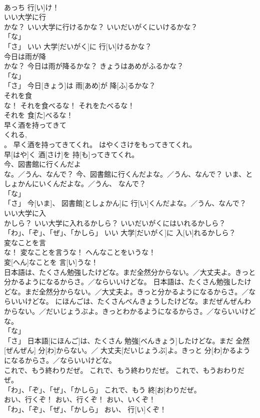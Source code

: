 \documentclass[8pt]{extreport}
\begin{document}
\begin{CJK}{UTF8}{min}
\\	あっち 行[い]け！		
\\	いい大学に行
\\	かな？	いい大学に行けるかな？	いいだいがくにいけるかな？	
\\	「な」 
\\	「さ」	いい 大学[だいがく]に 行[い]けるかな？		
\\	今日は雨が降
\\	かな？	今日は雨が降るかな？	きょうはあめがふるかな？	
\\	「な」 
\\	「さ」	今日[きょう]は 雨[あめ]が 降[ふ]るかな？		
\\	それを食
\\	な！	それを食べるな！	それをたべるな！	
\\	それを 食[た]べるな！		
\\	早く酒を持ってきて
\\	くれる, 
\\	。	早く酒を持ってきてくれ。	はやくさけをもってきてくれ。	
\\	早[はや]く 酒[さけ]を 持[も]ってきてくれ。		
\\	今、図書館に行くんだよ
\\	な。／うん、なんで？	今、図書館に行くんだよな。／うん、なんで？	いま、としょかんにいくんだよな。／うん、 なんで？	
\\	「な」 
\\	「さ」	今[いま]、 図書館[としょかん]に 行[い]くんだよな。／うん、なんで？		
\\	いい大学に入
\\	かしら？	いい大学に入れるかしら？	いいだいがくにはいれるかしら？	
\\	「わ」、「ぞ」、「ぜ」、「かしら」	いい 大学[だいがく]に 入[い]れるかしら？		
\\	変なことを言
\\	な！	変なことを言うな！	へんなことをいうな！	
\\	変[へん]なことを 言[い]うな！		
\\	日本語は、たくさん勉強したけどな。まだ全然分からない。／大丈夫よ。きっと分かるようになるからさ。／ならいいけどな。	日本語は、たくさん勉強したけどな。まだ全然分からない。／大丈夫よ。きっと分かるようになるからさ。／ならいいけどな。	にほんごは、たくさんべんきょうしたけどな。まだぜんぜんわからない。／だいじょうぶよ。きっとわかるようになるからさ。／ならいいけどな。	
\\	「な」 
\\	「さ」	日本語[にほんご]は、たくさん 勉強[べんきょう]したけどな。まだ 全然[ぜんぜん] 分[わ]からない。／ 大丈夫[だいじょうぶ]よ。きっと 分[わ]かるようになるからさ。／ならいいけどな。		
\\	これで、もう終わりだぜ。	これで、もう終わりだぜ。	これで、もうおわりだぜ。	
\\	「わ」、「ぞ」、「ぜ」、「かしら」	これで、もう 終[お]わりだぜ。		
\\	おい、行くぞ！	おい、行くぞ！	おい、いくぞ！	
\\	「わ」、「ぞ」、「ぜ」、「かしら」	おい、 行[い]くぞ！		
\end{CJK}
\end{document}
